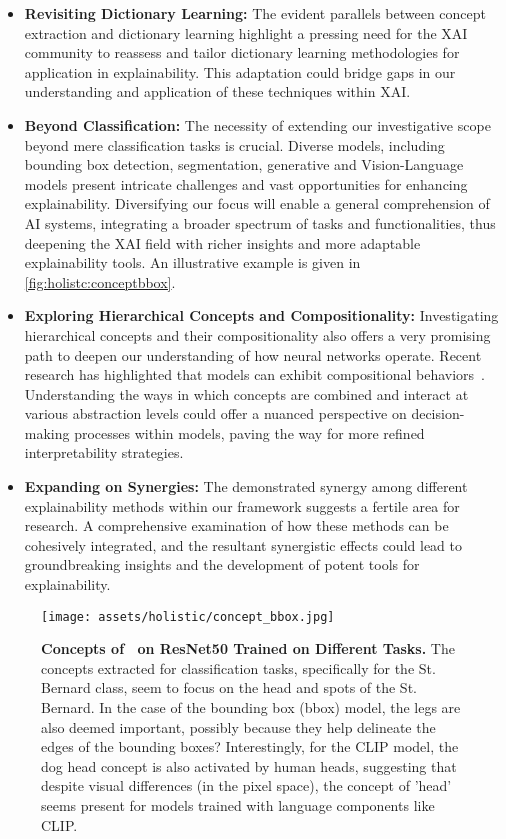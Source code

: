 \begin{itemize}

    \item \textbf{Revisiting Dictionary Learning:} The evident parallels between concept extraction and dictionary learning highlight a pressing need for the XAI community to reassess and tailor dictionary learning methodologies for application in explainability. This adaptation could bridge gaps in our understanding and application of these techniques within XAI.

    \item \textbf{Beyond Classification:} The necessity of extending our investigative scope beyond mere classification tasks is crucial. Diverse models, including bounding box detection, segmentation, generative and Vision-Language models present intricate challenges and vast opportunities for enhancing explainability. Diversifying our focus will enable a general comprehension of AI systems, integrating a broader spectrum of tasks and functionalities, thus deepening the XAI field with richer insights and more adaptable explainability tools. An illustrative example is given in \autoref{fig:holistc:conceptbbox}.
    
    \item \textbf{Exploring Hierarchical Concepts and Compositionality:} Investigating hierarchical concepts and their compositionality also offers a very promising path to deepen our understanding of how neural networks operate. Recent research has highlighted that models can exhibit compositional behaviors~\cite{lepori2024break}. Understanding the ways in which concepts are combined and interact at various abstraction levels could offer a nuanced perspective on decision-making processes within models, paving the way for more refined interpretability strategies.
    
    \item \textbf{Expanding on Synergies:} The demonstrated synergy among different explainability methods within our framework suggests a fertile area for research. A comprehensive examination of how these methods can be cohesively integrated, and the resultant synergistic effects could lead to groundbreaking insights and the development of potent tools for explainability.
    
\end{itemize}

\begin{figure}
    \centering
    \texttt{[image: assets/holistic/concept\_bbox.jpg]}
    \caption{\textbf{Concepts of \craft~on ResNet50 Trained on Different Tasks.} The concepts extracted for classification tasks, specifically for the St. Bernard class, seem to focus on the head and spots of the St. Bernard. In the case of the bounding box (bbox) model, the legs are also deemed important, possibly because they help delineate the edges of the bounding boxes? Interestingly, for the CLIP model, the dog head concept is also activated by human heads, suggesting that despite visual differences (in the pixel space), the concept of 'head' seems present for models trained with language components like CLIP.}
    \label{fig:holistc:conceptbbox}
\end{figure}


